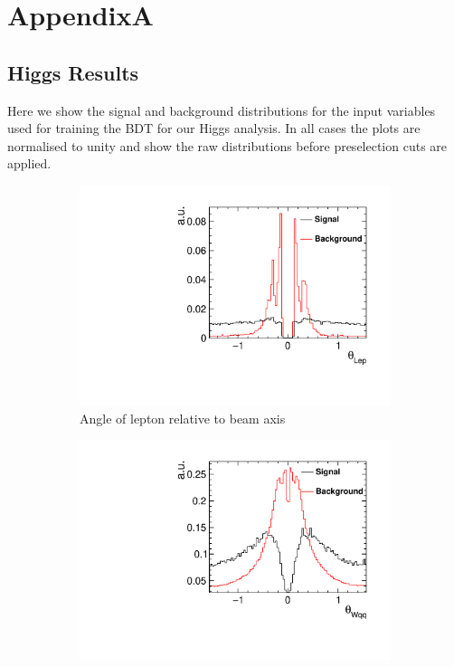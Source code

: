 \chapter{AppendixA}
\label{appendixA}

\section{Higgs Results}
Here we show the signal and background distributions for the input variables used for training the BDT for our Higgs analysis. In all cases the plots are normalised to unity and show the raw distributions before preselection cuts are applied.

\begin{figure}[h] 
  \begin{subfigure}[]{0.5\linewidth}
    \centering
    \includegraphics[width=0.75\linewidth]{Appendix/figures/DiraLep} 
    \caption{Angle of lepton relative to beam axis} 
    \vspace{4ex}
  \end{subfigure}%
  \begin{subfigure}[]{0.5\linewidth}
    \centering
    \includegraphics[width=0.75\linewidth]{Appendix/figures/DiraWqq} 

\end{subfigure}
\end{figure}
